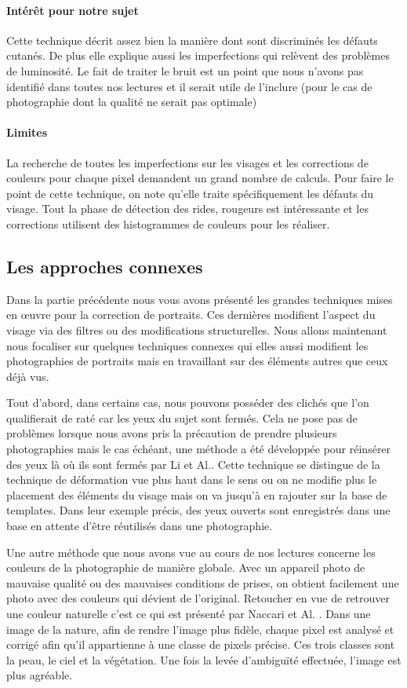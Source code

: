 \documentclass[11pt, french]{report-rd-info}
\begin{document}
\paragraph{Intérêt pour notre sujet}
Cette technique décrit assez bien la manière dont sont discriminés les défauts cutanés. De plus elle explique aussi les imperfections qui relèvent des problèmes de luminosité. Le fait de traiter le bruit est un point que nous n’avons pas identifié dans toutes nos lectures et il serait utile de l’inclure (pour le cas de photographie dont la qualité ne serait pas optimale)
\paragraph{Limites}
La recherche de toutes les imperfections sur les visages et les corrections de couleurs pour chaque pixel demandent un grand nombre de calculs.
Pour faire le point de cette technique, on note qu’elle traite spécifiquement les défauts du visage. Tout la phase de détection des rides, rougeurs est intéressante et les corrections utilisent des histogrammes de couleurs pour les réaliser.
\subsection{Les approches connexes}
Dans la partie précédente nous vous avons présenté les grandes techniques mises en œuvre pour la correction de portraits. Ces dernières modifient l’aspect du visage via des filtres ou des modifications structurelles. Nous allons maintenant nous focaliser sur quelques techniques connexes qui elles aussi modifient les photographies de portraits mais en travaillant sur des éléments autres que ceux déjà vus.

Tout d’abord, dans certains cas, nous pouvons posséder des clichés que l'on qualifierait de raté car les yeux du sujet sont fermés. Cela ne pose pas de problèmes lorsque nous avons pris la précaution de prendre plusieurs photographies mais le cas échéant, une méthode a été développée pour réinsérer des yeux là où ils sont fermés par Li et Al.\cite{Li2011}. Cette technique se distingue de la technique de déformation vue plus haut dans le sens ou on ne modifie plus le placement des éléments du visage mais on va jusqu'à en rajouter sur la base de templates. Dans leur exemple précis, des yeux ouverts sont enregistrés dans une base en attente d’être réutilisés dans une photographie.

Une autre méthode que nous avons vue au cours de nos lectures concerne les couleurs de la photographie de manière globale. Avec un appareil photo de mauvaise qualité ou des mauvaises conditions de prises, on obtient facilement une photo avec des couleurs qui dévient de l’original. Retoucher en vue de retrouver une couleur naturelle c'est ce qui est présenté par Naccari et Al. \cite{Naccari}. Dans une image de la nature, afin de rendre l’image plus fidèle, chaque pixel est analysé et corrigé afin qu’il appartienne à une classe de pixels précise. Ces trois classes sont la peau, le ciel et la végétation. Une fois la levée d’ambiguïté effectuée, l’image est plus agréable.
\end{document}
